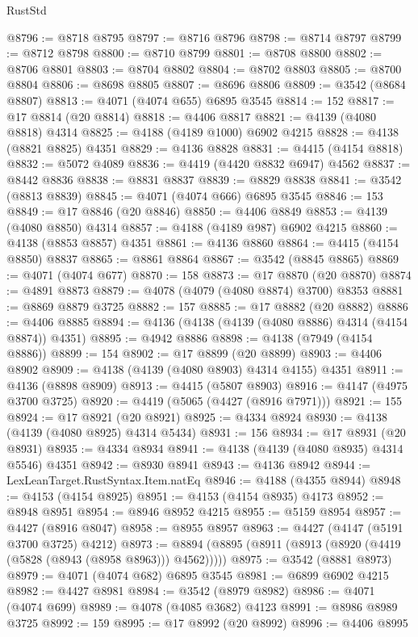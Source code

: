 \begin{lexlean}{RustStd}
\begin{coremodule}
@8796 := @8718 @8795
@8797 := @8716 @8796
@8798 := @8714 @8797
@8799 := @8712 @8798
@8800 := @8710 @8799
@8801 := @8708 @8800
@8802 := @8706 @8801
@8803 := @8704 @8802
@8804 := @8702 @8803
@8805 := @8700 @8804
@8806 := @8698 @8805
@8807 := @8696 @8806
@8809 := @3542 (@8684 @8807)
@8813 := @4071 (@4074 @655) @6895 @3545
@8814 := 152
@8817 := @17 @8814 (@20 @8814)
@8818 := @4406 @8817
@8821 := @4139 (@4080 @8818) @4314
@8825 := @4188 (@4189 @1000) @6902 @4215
@8828 := @4138 (@8821 @8825) @4351
@8829 := @4136 @8828
@8831 := @4415 (@4154 @8818)
@8832 := @5072 @4089
@8836 := @4419 (@4420 @8832 @6947) @4562
@8837 := @8442 @8836
@8838 := @8831 @8837
@8839 := @8829 @8838
@8841 := @3542 (@8813 @8839)
@8845 := @4071 (@4074 @666) @6895 @3545
@8846 := 153
@8849 := @17 @8846 (@20 @8846)
@8850 := @4406 @8849
@8853 := @4139 (@4080 @8850) @4314
@8857 := @4188 (@4189 @987) @6902 @4215
@8860 := @4138 (@8853 @8857) @4351
@8861 := @4136 @8860
@8864 := @4415 (@4154 @8850) @8837
@8865 := @8861 @8864
@8867 := @3542 (@8845 @8865)
@8869 := @4071 (@4074 @677)
@8870 := 158
@8873 := @17 @8870 (@20 @8870)
@8874 := @4891 @8873
@8879 := @4078 (@4079 (@4080 @8874) @3700) @8353
@8881 := @8869 @8879 @3725
@8882 := 157
@8885 := @17 @8882 (@20 @8882)
@8886 := @4406 @8885
@8894 := @4136 (@4138 (@4139 (@4080 @8886) @4314 (@4154 @8874)) @4351)
@8895 := @4942 @8886
@8898 := @4138 (@7949 (@4154 @8886))
@8899 := 154
@8902 := @17 @8899 (@20 @8899)
@8903 := @4406 @8902
@8909 := @4138 (@4139 (@4080 @8903) @4314 @4155) @4351
@8911 := @4136 (@8898 @8909)
@8913 := @4415 (@5807 @8903)
@8916 := @4147 (@4975 @3700 @3725)
@8920 := @4419 (@5065 (@4427 (@8916 @7971)))
@8921 := 155
@8924 := @17 @8921 (@20 @8921)
@8925 := @4334 @8924
@8930 := @4138 (@4139 (@4080 @8925) @4314 @5434)
@8931 := 156
@8934 := @17 @8931 (@20 @8931)
@8935 := @4334 @8934
@8941 := @4138 (@4139 (@4080 @8935) @4314 @5546) @4351
@8942 := @8930 @8941
@8943 := @4136 @8942
@8944 := LexLeanTarget.RustSyntax.Item.natEq
@8946 := @4188 (@4355 @8944)
@8948 := @4153 (@4154 @8925)
@8951 := @4153 (@4154 @8935) @4173
@8952 := @8948 @8951
@8954 := @8946 @8952 @4215
@8955 := @5159 @8954
@8957 := @4427 (@8916 @8047)
@8958 := @8955 @8957
@8963 := @4427 (@4147 (@5191 @3700 @3725) @4212)
@8973 := @8894 (@8895 (@8911 (@8913 (@8920 (@4419 (@5828 (@8943 (@8958 @8963))) @4562)))))
@8975 := @3542 (@8881 @8973)
@8979 := @4071 (@4074 @682) @6895 @3545
@8981 := @6899 @6902 @4215
@8982 := @4427 @8981
@8984 := @3542 (@8979 @8982)
@8986 := @4071 (@4074 @699)
@8989 := @4078 (@4085 @3682) @4123
@8991 := @8986 @8989 @3725
@8992 := 159
@8995 := @17 @8992 (@20 @8992)
@8996 := @4406 @8995

\end{coremodule}
\end{lexlean}
